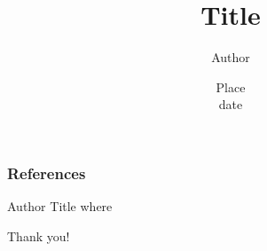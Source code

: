 \documentclass[xcolor=pdftex,dvipsnames,table]{presentation}
\begin{document}
\title[Title] %
{
	Title
}
\author[Author] %
{
	Author
}
\date[date] %
{
	Place\\
	date
}


\frame{\titlepage}

\frame{
	
}

\begin{frame}[allowframebreaks]
\frametitle{References}
  \begin{thebibliography}{10}    
  	Author
	 \newblock Title
  	 \newblock where
  \end{thebibliography}
\end{frame}

\begin{frame}
\begin{Large}
\begin{center}
Thank you!
\end{center}
\end{Large}
\end{frame}
\end{document}
